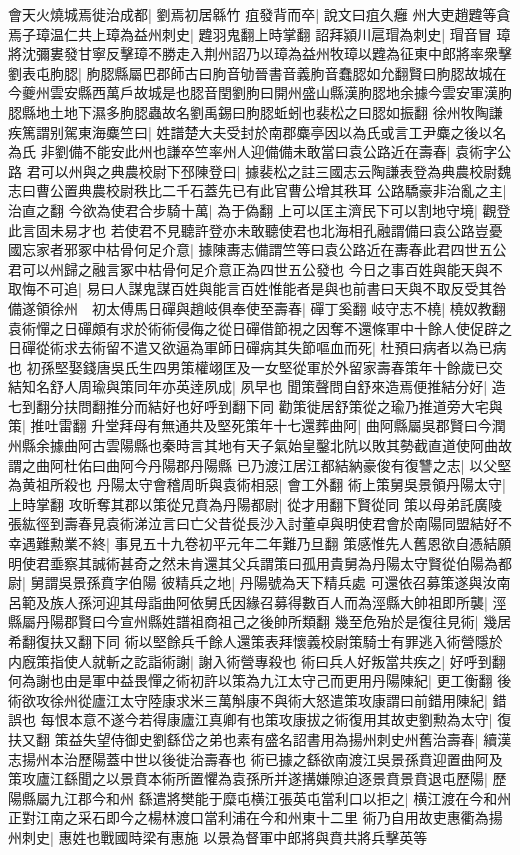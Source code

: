 會天火燒城焉徙治成都|{
	劉焉初居緜竹}
疽發背而卒|{
	說文曰疽久癰}
州大吏趙韙等貪焉子璋温仁共上璋為益州刺史|{
	韙羽鬼翻上時掌翻}
詔拜潁川扈瑁為刺史|{
	瑁音冒}
璋將沈彌婁發甘寧反擊璋不勝走入荆州詔乃以璋為益州牧璋以韙為征東中郎將率衆擊劉表屯朐䏰|{
	胊䏰縣屬巴郡師古曰朐音劬晉書音義朐音蠢䏰如允翻賢曰朐䏰故城在今夔州雲安縣西萬戶故城是也䏰音閏劉朐曰開州盛山縣漢胊䏰地余據今雲安軍漢朐䏰縣地土地下濕多朐䏰蟲故名劉禹錫曰朐䏰蚯蚓也裴松之曰䏰如振翻}
徐州牧陶謙疾篤謂别駕東海麋竺曰|{
	姓譜楚大夫受封於南郡麋亭因以為氏或言工尹麋之後以名為氏}
非劉備不能安此州也謙卒竺率州人迎備備未敢當曰袁公路近在壽春|{
	袁術字公路}
君可以州與之典農校尉下邳陳登曰|{
	據裴松之註三國志云陶謙表登為典農校尉魏志曰曹公置典農校尉秩比二千石蓋先已有此官曹公增其秩耳}
公路驕豪非治亂之主|{
	治直之翻}
今欲為使君合步騎十萬|{
	為于偽翻}
上可以匡主濟民下可以割地守境|{
	觀登此言固未易才也}
若使君不見聽許登亦未敢聽使君也北海相孔融謂備曰袁公路豈憂國忘家者邪冢中枯骨何足介意|{
	據陳夀志備謂竺等曰袁公路近在夀春此君四世五公君可以州歸之融言冢中枯骨何足介意正為四世五公發也}
今日之事百姓與能天與不取悔不可追|{
	易曰人謀鬼謀百姓與能言百姓惟能者是與也前書曰天與不取反受其咎}
備遂領徐州　初太傅馬日磾與趙岐俱奉使至壽春|{
	磾丁奚翻}
岐守志不橈|{
	橈奴教翻}
袁術憚之日磾頗有求於術術侵侮之從日磾借節視之因奪不還條軍中十餘人使促辟之日磾從術求去術留不遣又欲逼為軍師日磾病其失節嘔血而死|{
	杜預曰病者以為已病也}
初孫堅娶錢唐吳氏生四男策權翊匡及一女堅從軍於外留家壽春策年十餘歲已交結知名舒人周瑜與策同年亦英逹夙成|{
	夙早也}
聞策聲問自舒來造焉便推結分好|{
	造七到翻分扶問翻推分而結好也好呼到翻下同}
勸策徙居舒策從之瑜乃推道旁大宅與策|{
	推吐雷翻}
升堂拜母有無通共及堅死策年十七還葬曲阿|{
	曲阿縣屬吳郡賢曰今潤州縣余據曲阿古雲陽縣也秦時言其地有天子氣始皇鑿北阬以敗其勢截直道使阿曲故謂之曲阿杜佑曰曲阿今丹陽郡丹陽縣}
已乃渡江居江都結納豪俊有復讐之志|{
	以父堅為黄祖所殺也}
丹陽太守會稽周昕與袁術相惡|{
	會工外翻}
術上策舅吳景領丹陽太守|{
	上時掌翻}
攻昕奪其郡以策從兄賁為丹陽都尉|{
	從才用翻下賢從同}
策以母弟託廣陵張紘徑到壽春見袁術涕泣言曰亡父昔從長沙入討董卓與明使君會於南陽同盟結好不幸遇難勲業不終|{
	事見五十九卷初平元年二年難乃旦翻}
策感惟先人舊恩欲自憑結願明使君埀察其誠術甚奇之然未肯還其父兵謂策曰孤用貴舅為丹陽太守賢從伯陽為都尉|{
	舅謂吳景孫賁字伯陽}
彼精兵之地|{
	丹陽號為天下精兵處}
可還依召募策遂與汝南呂範及族人孫河迎其母詣曲阿依舅氏因緣召募得數百人而為涇縣大帥祖即所襲|{
	涇縣屬丹陽郡賢曰今宣州縣姓譜祖商祖己之後帥所類翻}
幾至危殆於是復往見術|{
	幾居希翻復扶又翻下同}
術以堅餘兵千餘人還策表拜懷義校尉策騎士有罪逃入術營隱於内廐策指使人就斬之訖詣術謝|{
	謝入術營專殺也}
術曰兵人好叛當共疾之|{
	好呼到翻}
何為謝也由是軍中益畏憚之術初許以策為九江太守己而更用丹陽陳紀|{
	更工衡翻}
後術欲攻徐州從廬江太守陸康求米三萬斛康不與術大怒遣策攻康謂曰前錯用陳紀|{
	錯誤也}
每恨本意不遂今若得康廬江真卿有也策攻康拔之術復用其故吏劉勲為太守|{
	復扶又翻}
策益失望侍御史劉繇岱之弟也素有盛名詔書用為揚州刺史州舊治壽春|{
	續漢志揚州本治歷陽蓋中世以後徙治壽春也}
術已據之繇欲南渡江吳景孫賁迎置曲阿及策攻廬江繇聞之以景賁本術所置懼為袁孫所并遂搆嫌隙迫逐景賁景賁退屯歷陽|{
	歷陽縣屬九江郡今和州}
繇遣將樊能于糜屯横江張英屯當利口以拒之|{
	横江渡在今和州正對江南之采石即今之楊林渡口當利浦在今和州東十二里}
術乃自用故吏惠衢為揚州刺史|{
	惠姓也戰國時梁有惠施}
以景為督軍中郎將與賁共將兵擊英等

